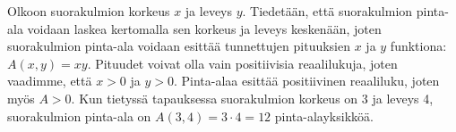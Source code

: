
\begin{esimerkki}
Olkoon suorakulmion korkeus $x$ ja leveys $y$. Tiedetään, että suorakulmion pinta-ala voidaan laskea kertomalla sen korkeus ja leveys keskenään, joten suorakulmion pinta-ala voidaan esittää tunnettujen pituuksien $x$ ja $y$ funktiona: $A(x,y)=xy$. Pituudet voivat olla vain positiivisia reaalilukuja, joten vaadimme, että $x>0$ ja $y>0$. Pinta-alaa esittää positiivinen reaaliluku, joten myös $A>0$. Kun tietyssä tapauksessa suorakulmion korkeus on 3 ja leveys 4, suorakulmion pinta-ala on $A(3,4)=3\cdot 4=12$ pinta-alayksikköä.
\end{esimerkki}




